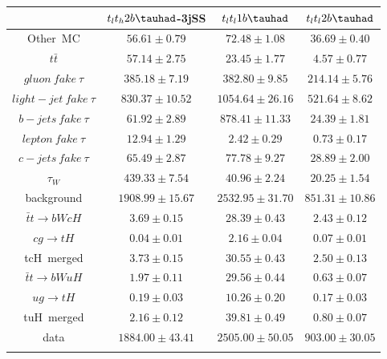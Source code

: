 \centering
\begin{tabular}{cccc} \toprule\toprule
 & $t_{l}t_{h}2b\tauhad$-3jSS & $t_{l}t_{l}1b\tauhad$ & $t_{l}t_{l}2b\tauhad$ \\\midrule
 Other~MC & $56.61\pm0.79$ & $72.48\pm1.08$ & $36.69\pm0.40$ \\
$t\bar{t}$ & $57.14\pm2.75$ & $23.45\pm1.77$ & $4.57\pm0.77$\\
$gluon~fake~\tau$ & $385.18\pm7.19$ & $382.80\pm9.85$ & $214.14\pm5.76$\\
$light-jet~fake~\tau$ & $830.37\pm10.52$ & $1054.64\pm26.16$ & $521.64\pm8.62$\\
$b-jets~fake~\tau$ & $61.92\pm2.89$ & $878.41\pm11.33$ & $24.39\pm1.81$\\
$lepton~fake~\tau$ & $12.94\pm1.29$ & $2.42\pm0.29$ & $0.73\pm0.17$\\
$c-jets~fake~\tau$ & $65.49\pm2.87$ & $77.78\pm9.27$ & $28.89\pm2.00$\\
$\tau_{W}$ & $439.33\pm7.54$ & $40.96\pm2.24$ & $20.25\pm1.54$\\
background & $1908.99\pm15.67$ & $2532.95\pm31.70$ & $851.31\pm10.86$\\\midrule
$\bar{t}t\to bWcH$ & $3.69\pm0.15$ & $28.39\pm0.43$ & $2.43\pm0.12$\\
$cg\to tH$ & $0.04\pm0.01$ & $2.16\pm0.04$ & $0.07\pm0.01$\\
tcH~merged & $3.73\pm0.15$ & $30.55\pm0.43$ & $2.50\pm0.13$\\
$\bar{t}t\to bWuH$ & $1.97\pm0.11$ & $29.56\pm0.44$ & $0.63\pm0.07$\\
$ug\to tH$ & $0.19\pm0.03$ & $10.26\pm0.20$ & $0.17\pm0.03$\\
tuH~merged & $2.16\pm0.12$ & $39.81\pm0.49$ & $0.80\pm0.07$\\\midrule
data & $1884.00\pm43.41$ & $2505.00\pm50.05$ & $903.00\pm30.05$\\
\bottomrule\bottomrule\\
\end{tabular}
